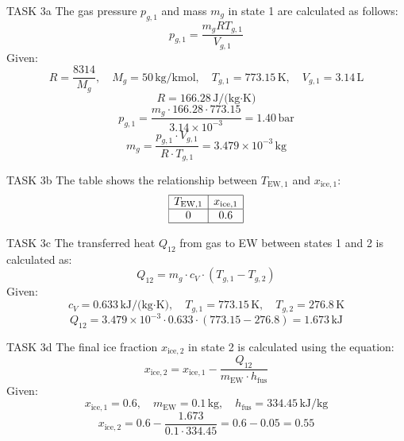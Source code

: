 TASK 3a  
The gas pressure \( p_{g,1} \) and mass \( m_g \) in state 1 are calculated as follows:  
\[
p_{g,1} = \frac{m_g R T_{g,1}}{V_{g,1}}
\]  
Given:  
\[
R = \frac{8314}{M_g}, \quad M_g = 50 \, \text{kg/kmol}, \quad T_{g,1} = 773.15 \, \text{K}, \quad V_{g,1} = 3.14 \, \text{L}
\]  
\[
R = 166.28 \, \text{J/(kg·K)}
\]  
\[
p_{g,1} = \frac{m_g \cdot 166.28 \cdot 773.15}{3.14 \times 10^{-3}} = 1.40 \, \text{bar}
\]  
\[
m_g = \frac{p_{g,1} \cdot V_{g,1}}{R \cdot T_{g,1}} = 3.479 \times 10^{-3} \, \text{kg}
\]  

TASK 3b  
The table shows the relationship between \( T_{\text{EW},1} \) and \( x_{\text{ice},1} \):  
\[
\begin{array}{|c|c|}
\hline
T_{\text{EW},1} & x_{\text{ice},1} \\
\hline
0 & 0.6 \\
\hline
\end{array}
\]  

TASK 3c  
The transferred heat \( Q_{12} \) from gas to EW between states 1 and 2 is calculated as:  
\[
Q_{12} = m_g \cdot c_V \cdot (T_{g,1} - T_{g,2})
\]  
Given:  
\[
c_V = 0.633 \, \text{kJ/(kg·K)}, \quad T_{g,1} = 773.15 \, \text{K}, \quad T_{g,2} = 276.8 \, \text{K}
\]  
\[
Q_{12} = 3.479 \times 10^{-3} \cdot 0.633 \cdot (773.15 - 276.8) = 1.673 \, \text{kJ}
\]  

TASK 3d  
The final ice fraction \( x_{\text{ice},2} \) in state 2 is calculated using the equation:  
\[
x_{\text{ice},2} = x_{\text{ice},1} - \frac{Q_{12}}{m_{\text{EW}} \cdot h_{\text{fus}}}
\]  
Given:  
\[
x_{\text{ice},1} = 0.6, \quad m_{\text{EW}} = 0.1 \, \text{kg}, \quad h_{\text{fus}} = 334.45 \, \text{kJ/kg}
\]  
\[
x_{\text{ice},2} = 0.6 - \frac{1.673}{0.1 \cdot 334.45} = 0.6 - 0.05 = 0.55
\]